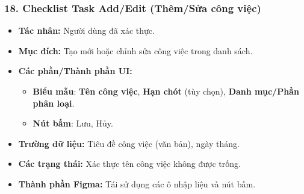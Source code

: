 \documentclass[11pt,a4paper]{article}
\begin{document}
\subsubsection{18. Checklist Task Add/Edit (Thêm/Sửa công việc)}
\begin{itemize}
    \item \textbf{Tác nhân:} Người dùng đã xác thực.
    \item \textbf{Mục đích:} Tạo mới hoặc chỉnh sửa công việc trong danh sách.
    \item \textbf{Các phần/Thành phần UI:}
    \begin{itemize}
        \item \textbf{Biểu mẫu}: \textbf{Tên công việc}, \textbf{Hạn chót} (tùy chọn), \textbf{Danh mục/Phần phân loại}.
        \item \textbf{Nút bấm}: Lưu, Hủy.
    \end{itemize}
    \item \textbf{Trường dữ liệu:} Tiêu đề công việc (văn bản), ngày tháng.
    \item \textbf{Các trạng thái:} Xác thực tên công việc không được trống.
    \item \textbf{Thành phần Figma:} Tái sử dụng các ô nhập liệu và nút bấm.
\end{itemize}
\end{document}

